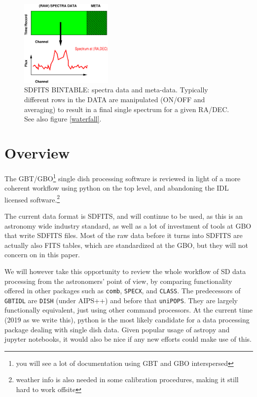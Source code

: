 \documentclass[12pt,a4paper]{article}
\begin{document}
\begin{figure}[h]
\centering
  \includegraphics[width=0.4\textwidth]{fig2.eps}
  \caption{\label{bintable} SDFITS BINTABLE: spectra data and meta-data.
    Typically different rows in the DATA are manipulated (ON/OFF and averaging)
    to result in a final single spectrum for a given RA/DEC. See also
    figure \ref{waterfall}.}
\end{figure}


\section{Overview}

The GBT/GBO\footnote{you will see a lot of documentation using GBT and
  GBO interspersed} single dish processing software is reviewed in
light of a more coherent workflow using python on the top level, and
abandoning the IDL licensed software.\footnote{weather info is also
  needed in some calibration procedures, making it still hard to work
  offsite}

The current data format is SDFITS, and will continue to be used, as
this is an astronomy wide industry standard, as well as a lot of
investment of tools at GBO that write SDFITS files. Most of the raw
data before it turns into SDFITS are actually also FITS tables, which
are standardized at the GBO, but they will not concern on in this
paper.

We will however take this opportunity to review the whole workflow of
SD data processing from the astronomers' point of view, by
comparing functionality offered in other packages such as {\tt comb},
{\tt SPECX}, and {\tt CLASS}. The predecessors of {\tt GBTIDL} are
{\tt DISH} (under AIPS++) and before that {\tt uniPOPS}. They are
largely functionally equivalent, just using other command
processors. At the current time (2019 as we write this), python is the
most likely candidate for a data processing package dealing with
single dish data. Given popular usage of astropy and jupyter
notebooks, it would also be nice if any new efforts could make use of
this.
\end{document}
